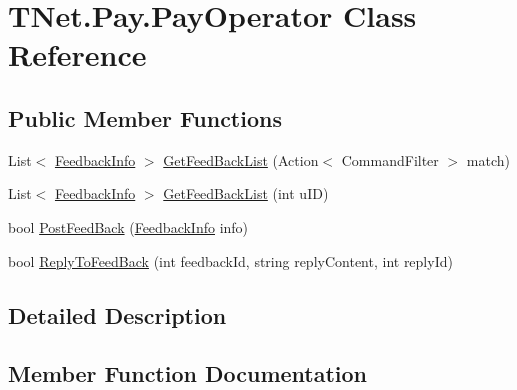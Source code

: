 \hypertarget{class_t_net_1_1_pay_1_1_pay_operator}{}\section{T\+Net.\+Pay.\+Pay\+Operator Class Reference}
\label{class_t_net_1_1_pay_1_1_pay_operator}


 


\subsection*{Public Member Functions}
\begin{DoxyCompactItemize}
\item 
List$<$ \mbox{\hyperlink{class_t_net_1_1_pay_1_1_feedback_info}{Feedback\+Info}} $>$ \mbox{\hyperlink{class_t_net_1_1_pay_1_1_pay_operator_a5791252e006d4e0df0e65892d3259a12}{Get\+Feed\+Back\+List}} (Action$<$ Command\+Filter $>$ match)
\item 
List$<$ \mbox{\hyperlink{class_t_net_1_1_pay_1_1_feedback_info}{Feedback\+Info}} $>$ \mbox{\hyperlink{class_t_net_1_1_pay_1_1_pay_operator_a59e1c5e6736e216e1a3b93a680720166}{Get\+Feed\+Back\+List}} (int u\+ID)
\item 
bool \mbox{\hyperlink{class_t_net_1_1_pay_1_1_pay_operator_a994eb07d222a423005156400e5af1f8a}{Post\+Feed\+Back}} (\mbox{\hyperlink{class_t_net_1_1_pay_1_1_feedback_info}{Feedback\+Info}} info)
\item 
bool \mbox{\hyperlink{class_t_net_1_1_pay_1_1_pay_operator_a3d5ecb53b3b628e8666b905870d54baf}{Reply\+To\+Feed\+Back}} (int feedback\+Id, string reply\+Content, int reply\+Id)
\end{DoxyCompactItemize}


\subsection{Detailed Description}




\subsection{Member Function Documentation}
\mbox{\label{class_t_net_1_1_pay_1_1_pay_operator_a5791252e006d4e0df0e65892d3259a12}} 
